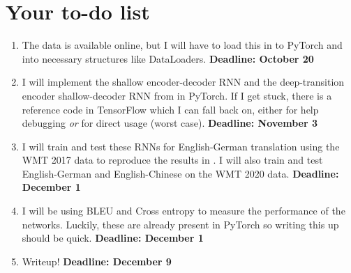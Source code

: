 \documentclass[11pt,letterpaper]{article}
\newcommand{\blue}[1]{\textcolor{RoyalBlue}{#1}}
\newcommand{\instructions}[1]{\blue{\textit{#1}}}
\renewcommand{\instructions}[1]{}
\begin{document}
\section*{Your to-do list}
\instructions{Get started by making a to-do list. Set yourself deadlines. Here are a few
  items that might appear on your to-do list}
\begin{enumerate}
\item The data is available online, but I will have to load this in to PyTorch and into necessary structures like DataLoaders. \textbf{Deadline: October 20}

\item I will implement the shallow encoder-decoder RNN and the deep-transition encoder shallow-decoder RNN from \cite{miceli-barone-etal-2017-deep} in PyTorch. If I get stuck, there is a reference code in TensorFlow which I can fall back on, either for help debugging \textit{or} for direct usage (worst case). \textbf{Deadline: November 3}

\item I will train and test these RNNs for English-German translation using the WMT 2017 data to reproduce the results in \cite{miceli-barone-etal-2017-deep}. I will also train and test English-German and English-Chinese on the WMT 2020 data. \textbf{Deadline: December 1}

  \item I will be using BLEU and Cross entropy to measure the performance of the networks. Luckily, these are already present in PyTorch so writing this up should be quick. \textbf{Deadline: December 1}
  
\item Writeup! \textbf{Deadline: December 9}
\end{enumerate}

\instructions{Your references for the background section, should go in your own .bib file. You then need to run {\tt bibtex}.\footnote{You may want to look at \url{http://www.bibtex.org/Using/}}.  If you call your bibliography {\tt mybib.bib} and put it in the same directory as this {\tt .tex} file, add {\tt$\backslash$bibliography\{mybib\}} before {\tt$\backslash$end\{document\}}
}


\end{document}

